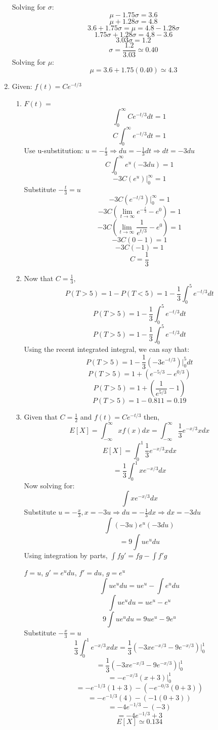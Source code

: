 \documentclass[12pt]{article}
\begin{document}
\begin{enumerate}
		Solving for $\sigma$:
			$$\mu -1.75\sigma = 3.6$$
			$$\mu + 1.28\sigma = 4.8$$
			$$3.6 + 1.75 \sigma = \mu = 4.8 - 1.28 \sigma$$
			$$1.75 \sigma + 1.28 \sigma = 4.8 - 3.6$$
			$$3.03\sigma = 1.2$$
			$$\sigma = \frac{1.2}{3.03} \simeq 0.40$$
		Solving for $\mu$:
			$$\mu = 3.6 + 1.75(0.40)  \simeq 4.3$$
	\item Given: $f(t) = Ce^{-t/3}$
		\begin{enumerate}
			\item $F(t) = $
			 	$$\int_{0}^{\infty} Ce^{-t/3}dt = 1$$
				$$C\int_{0}^{\infty} e^{-t/3}dt = 1$$
				Use u-substitution: $u = -\frac{t}{3} \Rightarrow du = -\frac{1}{3}dt \Rightarrow dt = -3du$
				$$C\int_{0}^{\infty} e^{u}(-3 du) = 1$$
				$$-3C(e^{u})\vert_{0}^{\infty} = 1$$
				Substitute $-\frac{t}{3} = u$
				$$-3C(e^{-t/3})\vert_{0}^{\infty} = 1$$
				$$-3C(\lim\limits_{t \to \infty} e^{-\frac{t}{3}} -  e^{0}) = 1$$
				$$-3C(\lim\limits_{t \to \infty} \frac{1}{e^{t/3}} -  e^0) = 1$$
				$$-3C(0 - 1) = 1$$
				$$-3C(-1) = 1$$
				$$C = \frac{1}{3}$$
			\item Now that $C = \frac{1}{3}$,
				$$P(T > 5) = 1 - P(T < 5) = 1 - \frac{1}{3} \int_{0}^{5} e^{-t/3}dt$$
				$$P(T > 5) = 1 - \frac{1}{3} \int_{0}^{5} e^{-t/3}dt$$
				$$P(T > 5) = 1 - \frac{1}{3} \int_{0}^{5} e^{-t/3}dt$$
				Using the recent integrated integral, we can say that:
				$$P(T > 5) = 1 - \frac{1}{3} (-3e^{-t/3})\vert_{0}^{5}dt$$
				$$P(T > 5) = 1 + (e^{-5/3} - e^{0/3})$$
				$$P(T > 5) = 1 + (\frac{1}{e^{5/3}} - 1)$$
				$$P(T > 5) = 1 - 0.811 = 0.19$$
			\item Given that $C = \frac{1}{2}$ and $f(t) = Ce^{-t/3}$ then, 
			$$E[X] = \int_{-\infty}^{\infty} xf(x)dx = \int_{-\infty}^{\infty} \frac{1}{3}e^{-x/3}xdx$$
			$$E[X] = \int_{0}^{1} \frac{1}{3}e^{-x/3}xdx$$
			$$= \frac{1}{3}\int_{0}^{1} xe^{-x/3}dx$$
			Now solving for:
			$$\int xe^{-x/3}dx$$
			Substitute $u = -\frac{x}{3}, x = -3u \Rightarrow du = -\frac{1}{3}dx \Rightarrow dx = -3du$
			$$\int (-3u)e^{u}(-3du)$$
			$$= 9\int ue^{u}du$$ 
			Using integration by parts, $\int fg' = fg - \int f'g$
			
			$f = u$, $g' = e^u du$, $f' = du$, $g = e^u$
			$$\int ue^{u}du = ue^u - \int e^u du$$
			$$\int ue^{u}du = ue^u - e^u$$
			$$9 \int ue^{u}du = 9ue^u - 9e^u$$
			Substitute $-\frac{x}{3} = u$
			$$\frac{1}{3}\int_{0}^{1} e^{-x/3}xdx = \frac{1}{3} (-3xe^{-x/3} - 9e^{-x/3})\vert_{0}^{1}$$
			$$= \frac{1}{3}(-3xe^{-x/3} - 9e^{-x/3})\vert_{0}^{1}$$
			$$= -e^{-x/3}(x + 3)\vert_{0}^{1}$$
			$$= -e^{-1/3}(1 + 3) - (-e^{-0/3}(0 + 3))$$
			$$= -e^{-1/3}(4) - (-1(0 + 3))$$
			$$= -4e^{-1/3} - (-3)$$
			$$= -4e^{-1/3} + 3$$
			$$E[X] \simeq 0.134$$
		\end{enumerate}
		

\end{enumerate}
\end{document}
